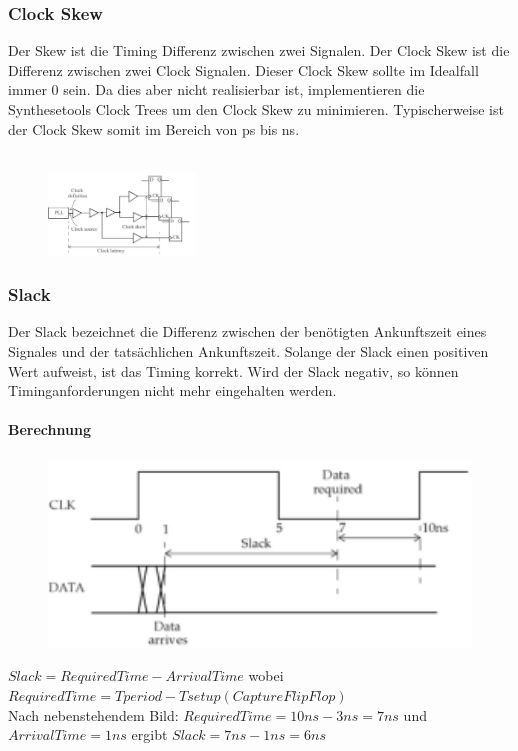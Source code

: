 \begin{multicols}{2}
    \subsubsection{Clock Skew}
    Der Skew ist die Timing Differenz zwischen zwei Signalen. Der Clock Skew ist die Differenz zwischen zwei Clock Signalen. Dieser Clock Skew sollte im Idealfall immer 0 sein. Da dies aber nicht realisierbar ist, implementieren die Synthesetools Clock Trees um den Clock Skew zu minimieren. Typischerweise ist der Clock Skew somit im Bereich von ps bis ns.
    \ \\ \ \\
    \begin{figure}[H]
        \includegraphics[width=0.35\textwidth]{images/clock_skew.png}
    \end{figure}
\end{multicols}

\subsubsection{Slack}
Der Slack bezeichnet die Differenz zwischen der benötigten Ankunftszeit eines Signales und der tatsächlichen Ankunftszeit. Solange der Slack einen positiven Wert aufweist, ist das Timing korrekt. Wird der Slack negativ, so können Timinganforderungen nicht mehr eingehalten werden.

\paragraph{Berechnung}
\begin{minipage}{0.3\textwidth}
    \begin{figure}[H]
        \includegraphics[width=1\textwidth]{images/slack.png}
    \end{figure}
\end{minipage}
\hfill
\begin{minipage}{0.65\textwidth}
    $Slack=RequiredTime-ArrivalTime$ wobei $RequiredTime=Tperiod-Tsetup(CaptureFlipFlop)$ \\
    Nach nebenstehendem Bild: $RequiredTime=10ns-3ns=7ns$ und $ArrivalTime=1ns$ ergibt $Slack=7ns-1ns=6ns$
\end{minipage}

